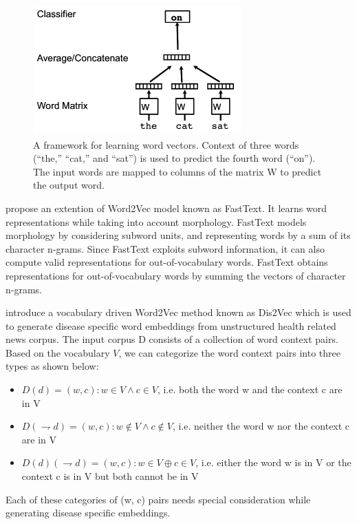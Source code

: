 \begin{figure}[h]
	\centering
	\includegraphics[width=8cm, height=5cm]{w2v.png}
	\caption{A framework for learning word vectors. Context of
		three words (“the,” “cat,” and “sat”) is used to predict the fourth
		word (“on”). The input words are mapped to columns of the matrix
		W to predict the output word.}
	\label{fig:Word2Vec model}
\end{figure}


 \citet{bojanowski2016enriching} propose an extention of Word2Vec model known as FastText. It learns word
 representations while taking into account morphology.
 FastText models morphology by considering subword
 units, and representing words by a sum of its character
 n-grams.  Since FastText exploits subword information, it can also
 compute valid representations for out-of-vocabulary
 words. FastText obtains representations for out-of-vocabulary words by summing the vectors of character
 n-grams.
  
 \citet{ghosh2016characterizing} introduce a vocabulary driven Word2Vec method known as Dis2Vec which is
 used to generate disease specific word embeddings from unstructured health
 related news corpus. The input corpus D consists of a collection of word context pairs. Based on the vocabulary $V$, we can categorize the word context pairs into three types as shown
 below:
 \\
 \begin{itemize}
 	\item $ D(d) = {(w, c): w \in V ∧c \in V }$, i.e. both the word w and the context c are in V
 	\item $D(\rightharpoondown d) = {(w, c): w \notin V ∧c \notin V }$, i.e. neither the word w nor the context c are in V
 	\item $D(d)(\rightharpoondown d) = {(w, c): w \in V \oplus c \in V }$, i.e. either the word w is in V or the context c is in V but both cannot be in V
 \end{itemize}
 
 Each of these categories of (w, c) pairs
 needs special consideration while generating disease specific embeddings.
 
